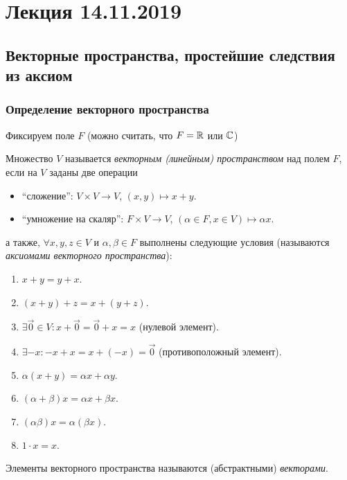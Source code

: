 \section{Лекция 14.11.2019}

\subsection{Векторные пространства, простейшие следствия из аксиом}

\subsubsection{Определение векторного пространства}

Фиксируем поле $F$ (можно считать, что $F = \mathbb{R}$ или $\mathbb{C}$)

\begin{definition}
    Множество $V$ называется \textit{векторным (линейным) пространством} над полем $F$, если на $V$ заданы две операции
    \begin{itemize}[nosep]
    \item ``сложение'': $V \times V \to V$, $(x, y) \mapsto x + y$.
    \item ``умножение на скаляр'': $F \times V \to V$, $(\alpha \in F, x \in V) \mapsto \alpha x$.
    \end{itemize}
    а также, $\forall x, y, z \in V$ и $\alpha, \beta \in F$ выполнены следующие условия (называются \textit{аксиомами векторного пространства}):
    \begin{enumerate}[nosep]
    \item $x + y = y + x$.
    \item $(x + y) + z = x + (y + z)$.
    \item $\exists \overrightarrow{0} \in V : x + \overrightarrow{0} = \overrightarrow{0} + x = x$ (нулевой элемент).
    \item $\exists -x : -x + x = x + (-x) = \overrightarrow{0}$ (противоположный элемент).
    \item $\alpha(x + y) = \alpha x + \alpha y$.
    \item $(\alpha + \beta)x = \alpha x + \beta x$.
    \item $(\alpha \beta)x = \alpha(\beta x)$.
    \item $1 \cdot x = x$.
    \end{enumerate}
\end{definition}

\begin{definition}
    Элементы векторного пространства называются (абстрактными) \textit{векторами}.
\end{definition}

